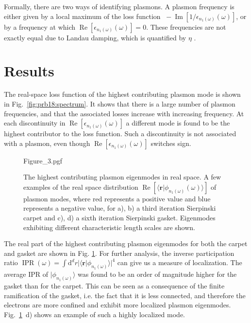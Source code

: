 Formally, there are two ways of identifying plasmons. A plasmon frequency is either given by a local maximum of the loss function $\;-\operatorname{Im}[1/\epsilon_{n_1(\omega)}(\omega)]$, or by a frequency at which $\operatorname{Re}[\epsilon_{n_1(\omega)}(\omega)] = 0$. These frequencies are not exactly equal due to Landau damping, which is quantified by $\eta$ \cite{andersen2012spatially}.

\section{Results}

The real-space loss function of the highest contributing plasmon mode is shown in Fig.~\ref{fig:prb18:spectrum}. It shows that there is a large number of plasmon frequencies, and that the associated losses increase with increasing frequency. At each discontinuity in $\operatorname{Re}[\epsilon_{n_1(\omega)}(\omega)]$ a different mode is found to be the highest contributor to the loss function. Such a discontinuity is not associated with a plasmon, even though $\operatorname{Re}[\epsilon_{n_1(\omega)}(\omega)]$ switches sign.

\begin{figure}[h]
    \centering
    {Figure_3.pgf}
    \caption{The highest contributing plasmon eigenmodes in real space. A few examples of the real space distribution $\operatorname{Re}[\langle\mathbf{r}| \phi_{n_1(\omega)}(\omega)\rangle]$ of plasmon modes, where red represents a positive value and blue represents a negative value, for a), b) a third iteration Sierpinski carpet and c), d) a sixth iteration Sierpinski gasket. Eigenmodes exhibiting different characteristic length scales are shown.}
    \label{fig:prb18:eigenstates}
\end{figure}

The real part of the highest contributing plasmon eigenmodes for both the carpet and gasket are shown in Fig. \ref{fig:prb18:eigenstates}. For further analysis, the inverse participation ratio $\operatorname{IPR}(\omega) = \int\!\!\text{d}^d r |\langle \mathbf{r}|\phi_{n_1(\omega)} \rangle|^4$ can give us a measure of localization. The average IPR of $|\phi_{n_1(\omega)}\rangle$ was found to be an order of magnitude higher for the gasket than for the carpet. This can be seen as a consequence of the finite ramification of the gasket, i.e. the fact that it is less connected, and therefore the electrons are more confined and exhibit more localized plasmon eigenmodes. Fig.~\ref{fig:prb18:eigenstates}~d) shows an example of such a highly localized mode.

